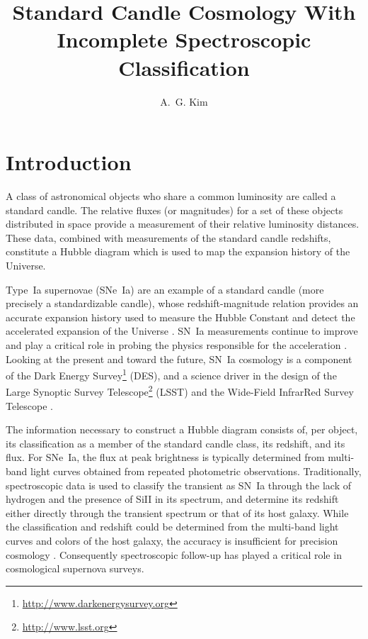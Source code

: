 \documentclass[preprint]{elsarticle}
\begin{document}
\begin{frontmatter}

\title{Standard Candle Cosmology With Incomplete Spectroscopic Classification}
\author{A.~G. Kim}
\address{Physics Division, Lawrence Berkeley National Laboratory, 1 Cyclotron Road, Berkeley CA, USA 94720}

\begin{abstract}
\end{abstract}
\begin{keyword}
\end{keyword}
\end{frontmatter}

\section{Introduction}
A class of astronomical objects who share a common luminosity are called a standard
candle.  The relative fluxes (or magnitudes) for a set of these objects distributed in space
provide a measurement of their relative luminosity distances. These data, combined with
measurements of the standard candle redshifts, constitute a Hubble
diagram which is used to map the expansion history of the Universe.

Type~Ia supernovae (SNe~Ia) are an example of a standard candle (more precisely a standardizable
candle), whose redshift-magnitude relation provides an accurate expansion history
used to measure the Hubble Constant
\citep{2001ApJ...553...47F} and detect the accelerated expansion of the Universe
\citep{1998AJ....116.1009R, 1999ApJ...517..565P}.  SN~Ia measurements continue
to improve 
\citep{2014A&A...568A..22B} and play a critical role in probing the physics
responsible for the acceleration \citep{2013PhR...530...87W}.
Looking at the present and toward the future, SN~Ia cosmology is
a component of the Dark Energy Survey\footnote{\url{http://www.darkenergysurvey.org}} (DES),
and a science driver in the design of the
Large Synoptic Survey Telescope\footnote{\url{http://www.lsst.org}} (LSST)
and the Wide-Field InfrarRed Survey Telescope
\citep{2015arXiv150303757S}.

The information necessary to construct a Hubble diagram consists of, per object,
its classification as a
member of the standard candle class, its redshift, and its flux.  For SNe~Ia, the flux at
peak brightness is typically determined from multi-band light curves obtained from repeated
photometric observations. Traditionally, spectroscopic data is used to classify the transient
as SN~Ia through the lack of hydrogen and the presence of SiII in its spectrum,
and determine its redshift either directly through the transient spectrum or that of its host
galaxy. While the classification and redshift could be determined from the multi-band
light curves and colors of the host galaxy, the accuracy is insufficient for precision
cosmology \citep{2011ApJ...738..162S}.  Consequently spectroscopic follow-up
has played a critical role in cosmological supernova surveys.
\end{document}
